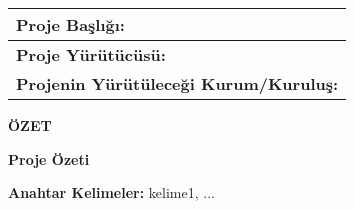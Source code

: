 \documentclass[a4paper]{article}
\begin{document}
\begin{center}

\end{center}
\vspace{0.3cm}

\begin{center}
\begin{tabular}{|m{}|}
\hline\vspace{1pt}
\textbf{Proje Başlığı:}  \\
\hline\vspace{1pt}
\textbf{Proje Yürütücüsü:}  \\
\hline\vspace{1pt}
\textbf{Projenin Yürütüleceği Kurum/Kuruluş:}  \\
\hline
\end{tabular}
\end{center}


\vspace{0.3cm}
\noindent\textbf{ÖZET}


\begin{ozet}
\begin{center}
\textbf{Proje Özeti}
\end{center}

\lipsum[1-3]

\tcbline*
\noindent\textbf{Anahtar Kelimeler:} 
kelime1, ... 
\end{ozet}
\vspace{0.3cm}
\end{document}
